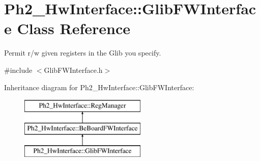 \hypertarget{class_ph2___hw_interface_1_1_glib_f_w_interface}{\section{Ph2\-\_\-\-Hw\-Interface\-:\-:Glib\-F\-W\-Interface Class Reference}
\label{class_ph2___hw_interface_1_1_glib_f_w_interface}
}


Permit r/w given registers in the Glib you specify.  




{\ttfamily \#include $<$Glib\-F\-W\-Interface.\-h$>$}

Inheritance diagram for Ph2\-\_\-\-Hw\-Interface\-:\-:Glib\-F\-W\-Interface\-:\begin{figure}[H]
\begin{center}
\leavevmode
\includegraphics[height=3.000000cm]{class_ph2___hw_interface_1_1_glib_f_w_interface}
\end{center}
\end{figure}

